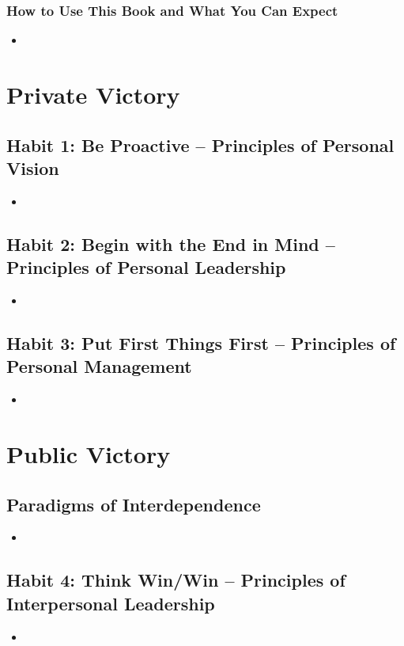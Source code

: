 \documentclass[11pt]{article}
\begin{document}
\subsubsection{How to Use This Book and What You Can Expect}
\begin{itemize}
\item 
\end{itemize}
\section{Private Victory}
\subsection{Habit 1: Be Proactive -- Principles of Personal Vision}
\begin{itemize}
\item 
\end{itemize}
\subsection{Habit 2: Begin with the End in Mind -- Principles of Personal Leadership}
\begin{itemize}
\item 
\end{itemize}
\subsection{Habit 3: Put First Things First -- Principles of Personal Management}
\begin{itemize}
\item 
\end{itemize}
\section{Public Victory}
\subsection{Paradigms of Interdependence}
\begin{itemize}
\item 
\end{itemize}
\subsection{Habit 4: Think Win/Win -- Principles of Interpersonal Leadership}
\begin{itemize}
\item 
\end{itemize}
\end{document}
